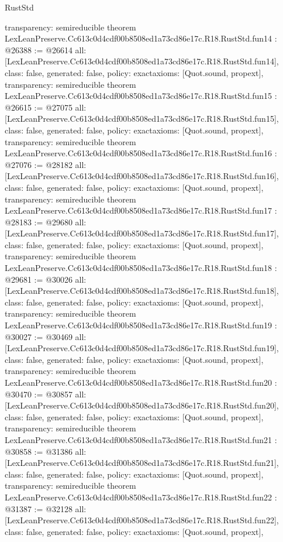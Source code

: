 \begin{lexlean}{RustStd}
\begin{coremodule}
{  transparency: semireducible
}
theorem LexLeanPreserve.Cc613c0d4cdf00b8508ed1a73cd86e17c.R18.RustStd.fun14 : @26388 := @26614 {
  all: [LexLeanPreserve.Cc613c0d4cdf00b8508ed1a73cd86e17c.R18.RustStd.fun14],
  class: false,
  generated: false,
  policy: exact{axioms: [Quot.sound, propext]},
  transparency: semireducible
}
theorem LexLeanPreserve.Cc613c0d4cdf00b8508ed1a73cd86e17c.R18.RustStd.fun15 : @26615 := @27075 {
  all: [LexLeanPreserve.Cc613c0d4cdf00b8508ed1a73cd86e17c.R18.RustStd.fun15],
  class: false,
  generated: false,
  policy: exact{axioms: [Quot.sound, propext]},
  transparency: semireducible
}
theorem LexLeanPreserve.Cc613c0d4cdf00b8508ed1a73cd86e17c.R18.RustStd.fun16 : @27076 := @28182 {
  all: [LexLeanPreserve.Cc613c0d4cdf00b8508ed1a73cd86e17c.R18.RustStd.fun16],
  class: false,
  generated: false,
  policy: exact{axioms: [Quot.sound, propext]},
  transparency: semireducible
}
theorem LexLeanPreserve.Cc613c0d4cdf00b8508ed1a73cd86e17c.R18.RustStd.fun17 : @28183 := @29680 {
  all: [LexLeanPreserve.Cc613c0d4cdf00b8508ed1a73cd86e17c.R18.RustStd.fun17],
  class: false,
  generated: false,
  policy: exact{axioms: [Quot.sound, propext]},
  transparency: semireducible
}
theorem LexLeanPreserve.Cc613c0d4cdf00b8508ed1a73cd86e17c.R18.RustStd.fun18 : @29681 := @30026 {
  all: [LexLeanPreserve.Cc613c0d4cdf00b8508ed1a73cd86e17c.R18.RustStd.fun18],
  class: false,
  generated: false,
  policy: exact{axioms: [Quot.sound, propext]},
  transparency: semireducible
}
theorem LexLeanPreserve.Cc613c0d4cdf00b8508ed1a73cd86e17c.R18.RustStd.fun19 : @30027 := @30469 {
  all: [LexLeanPreserve.Cc613c0d4cdf00b8508ed1a73cd86e17c.R18.RustStd.fun19],
  class: false,
  generated: false,
  policy: exact{axioms: [Quot.sound, propext]},
  transparency: semireducible
}
theorem LexLeanPreserve.Cc613c0d4cdf00b8508ed1a73cd86e17c.R18.RustStd.fun20 : @30470 := @30857 {
  all: [LexLeanPreserve.Cc613c0d4cdf00b8508ed1a73cd86e17c.R18.RustStd.fun20],
  class: false,
  generated: false,
  policy: exact{axioms: [Quot.sound, propext]},
  transparency: semireducible
}
theorem LexLeanPreserve.Cc613c0d4cdf00b8508ed1a73cd86e17c.R18.RustStd.fun21 : @30858 := @31386 {
  all: [LexLeanPreserve.Cc613c0d4cdf00b8508ed1a73cd86e17c.R18.RustStd.fun21],
  class: false,
  generated: false,
  policy: exact{axioms: [Quot.sound, propext]},
  transparency: semireducible
}
theorem LexLeanPreserve.Cc613c0d4cdf00b8508ed1a73cd86e17c.R18.RustStd.fun22 : @31387 := @32128 {
  all: [LexLeanPreserve.Cc613c0d4cdf00b8508ed1a73cd86e17c.R18.RustStd.fun22],
  class: false,
  generated: false,
  policy: exact{axioms: [Quot.sound, propext]},
}
\end{coremodule}
\end{lexlean}
